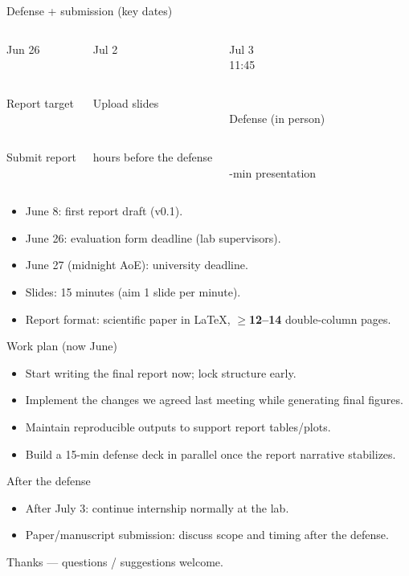 \documentclass[aspectratio=169]{beamer}
\newcommand{\statcard}[3]{%
  \begin{tcolorbox}[enhanced,boxrule=1pt,arc=2pt,
      colback=clight,colframe=cmid,
      top=3pt,bottom=3pt,left=3pt,right=3pt]
    \centering
    {\color{cmid}\large\bfseries\parbox[c][2.7em][c]{\linewidth}{\centering #1}}\\[1pt]
    {\color{ctext}\bfseries\tiny\parbox[c][2.8em][c]{\linewidth}{\centering #2}}\\[1pt]
    {\color{cmuted}\tiny\parbox[c][2.8em][c]{\linewidth}{\centering #3}}
  \end{tcolorbox}}
\begin{document}
\begin{frame}{Defense + submission (key dates)}
\begin{columns}[T,onlytextwidth]
  \statcard{Jun 26}{Report target}{Submit report}
  \statcard{Jul 2}{Upload slides}{24 hours before the defense}
  \statcard{Jul 3\\11:45}{Defense (in person)}{15-min presentation}
\end{columns}
\vspace{0.25cm}
\begin{itemize}\footnotesize\setlength\itemsep{3pt}
  \item June 8: first report draft (v0.1).
  \item June 26: evaluation form deadline (lab supervisors).
  \item June 27 (midnight AoE): university deadline.
  \item Slides: 15 minutes (aim 1 slide per minute).
  \item Report format: scientific paper in LaTeX, \textbf{$\ge$12--14} double-column pages.
\end{itemize}
\end{frame}


\begin{frame}{Work plan (now \textrightarrow{} June)}
\begin{itemize}\footnotesize\setlength\itemsep{4pt}
  \item Start writing the final report now; lock structure early.
  \item Implement the changes we agreed last meeting while generating final figures.
  \item Maintain reproducible outputs to support report tables/plots.
  \item Build a 15-min defense deck in parallel once the report narrative stabilizes.
\end{itemize}
\end{frame}

\begin{frame}{After the defense}
\begin{itemize}\footnotesize\setlength\itemsep{4pt}
  \item After July 3: continue internship normally at the lab.
  \item Paper/manuscript submission: discuss scope and timing after the defense.
\end{itemize}
\vspace{0.4cm}
{\small\color{cmuted}Thanks --- questions / suggestions welcome.}
\end{frame}
\end{document}
